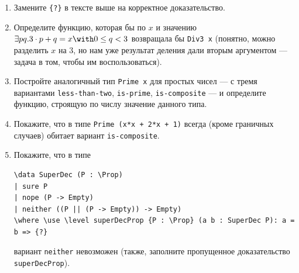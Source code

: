 \documentclass[10pt,a4paper,oneside]{article}
\begin{document}
\begin{enumerate}
\begin{enumerate}
\item Замените \verb!{?}! в тексте выше на корректное доказательство.
\item Определите функцию, которая бы по $x$ и значению $\exists p q.3 \cdot p + q = x \with 0 \le q < 3$ возвращала бы \verb!Div3 x!
(понятно, можно разделить $x$ на 3, но нам уже результат деления дали вторым аргументом --- задача в том, чтобы им воспользоваться).
\item Постройте аналогичный тип \verb!Prime x! для простых чисел --- с тремя вариантами \verb!less-than-two!, \verb!is-prime!, 
\verb!is-composite! --- и определите функцию, строящую по числу значение данного типа.
\item Покажите, что в типе \verb!Prime (x*x + 2*x + 1)! всегда (кроме граничных случаев) обитает вариант \verb!is-composite!.
\item Покажите, что в типе 
\begin{verbatim}
\data SuperDec (P : \Prop)
| sure P
| nope (P -> Empty)
| neither ((P || (P -> Empty)) -> Empty)
\where \use \level superDecProp {P : \Prop} (a b : SuperDec P): a = b => {?}
\end{verbatim}
вариант \verb!neither! невозможен (также, заполните пропущенное доказательство \verb!superDecProp!).
\end{enumerate}
\end{enumerate}
\end{document}
